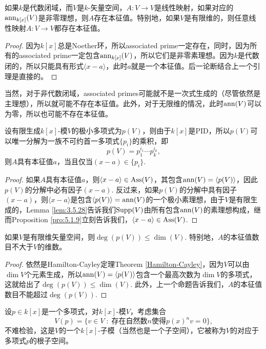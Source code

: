 \begin{pro}
    如果$k$是代数闭域，而$V$是$k$-矢量空间，$A:V\to V$是线性映射，如果对应的$\operatorname{ann}_{k[x]}(V)$是非零理想，则$A$存在本征值。特别地，如果$V$是有限维的，则任意线性映射$A:V\to V$都存在本征值。
\end{pro}

\begin{proof}
    因为$k[x]$总是Noether环，所以associated prime一定存在，同时，因为所有的associated prime一定包含$\operatorname{ann}_{k[x]}(V)$，所以它们是非零素理想。因为$k$是代数闭的，所以只能具有形式$\langle x-a\rangle$，此时$a$就是一个本征值。后一论断结合上一个引理是直接的。
\end{proof}

当然，对于非代数闭域，associated primes可能就不是一次式生成的（尽管依然是主理想），所以就可能不存在本征值。此外，对于无限维的情况，此时$\operatorname{ann}(V)$可以为零，所以也可能不存在本征值。

\begin{pro}
    设有限生成$k[x]$-模$V$的极小多项式为$p(V)$，则由于$k[x]$是PID，所以$p(V)$可以唯一分解为一族不可约首一多项式$\{p_i\}$的乘积，即
    \[
        p(V)=p_1^{i_1}\cdots p_k^{i_k},
    \]
    则$A$具有本征值$a$，当且仅当$(x-a)\in \{p_i\}$.
\end{pro}

\begin{proof}
    如果$A$具有本征值$a$，则$\langle x-a\rangle \in \operatorname{Ass}(V)$，其包含$\operatorname{ann}(V)=\langle p(V)\rangle$，因此$p(V)$的分解中必有因子$(x-a)$. 反过来，如果$p(V)$的分解中具有因子$(x-a)$，则$\langle x-a\rangle$是包含$\langle p(V)\rangle =\operatorname{ann}(V)$的一个极小素理想，由于$V$是有限生成的，Lemma \ref{lem:3.5.28}告诉我们$\operatorname{Supp}(V)$由所有包含$\operatorname{ann}(V)$的素理想构成，继而Proposition \ref{pro:5.1.9}立刻告诉我们，$\langle x-a\rangle \in \operatorname{Ass}(V)$.
\end{proof}

\begin{pro}
    如果$V$是有限维矢量空间，则$\deg(p(V))\leq \dim (V)$. 特别地，$A$的本征值数目不大于$V$的维数。
\end{pro}

\begin{proof}
    依然是Hamilton-Cayley定理Theorem \ref{Hamilton-Cayley}，因为$V$可以由$\dim V$个元素生成，所以$\operatorname{ann}(V)=\langle p(V)\rangle$包含一个最高次数为$\dim V$的多项式，这就给出了$\deg(p(V))\leq \dim (V)$. 此外，上一个命题告诉我们，$A$的本征值数目不能超过$\deg(p(V))$.
\end{proof}

\begin{para}[根子空间]
    设$p\in k[x]$是一个多项式，对$k[x]$-模$V$，考虑集合
    \[
        V(p)=\{v\in V\;:\; \text{存在自然数$n$使得$p(x)^nv=0$}\},
    \]
    不难检验，这是$V$的一个$k[x]$-子模（当然也是一个子空间），它被称为$V$的对应于多项式$p$的根子空间。
\end{para}

